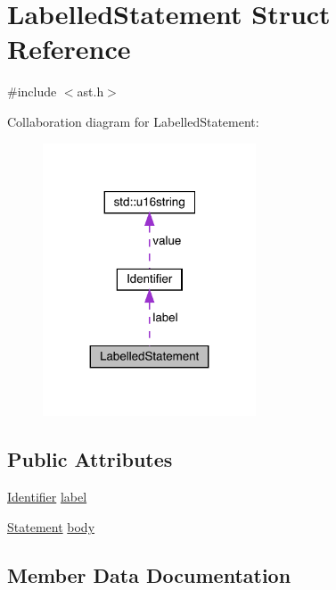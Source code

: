 \hypertarget{struct_labelled_statement}{}\section{Labelled\+Statement Struct Reference}
\label{struct_labelled_statement}


{\ttfamily \#include $<$ast.\+h$>$}



Collaboration diagram for Labelled\+Statement\+:\nopagebreak
\begin{figure}[H]
\begin{center}
\leavevmode
\includegraphics[width=179pt]{struct_labelled_statement__coll__graph}
\end{center}
\end{figure}
\subsection*{Public Attributes}
\begin{DoxyCompactItemize}
\item 
\hyperlink{struct_identifier}{Identifier} \hyperlink{struct_labelled_statement_a1f3102a32ae63ed59388b5c2e9292128}{label}
\item 
\hyperlink{ast_8h_a8b6ddf3732a0acd77e6b2509fb21a5fd}{Statement} \hyperlink{struct_labelled_statement_acf634fbf10e6a0d08d4f530f0a7310db}{body}
\end{DoxyCompactItemize}


\subsection{Member Data Documentation}
\mbox{\label{struct_labelled_statement_acf634fbf10e6a0d08d4f530f0a7310db}} 

